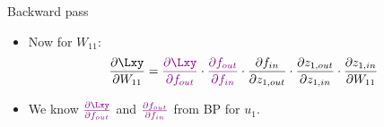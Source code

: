\begin{vbframe}{Backward pass}
  \begin{itemize}
    \item Now for $W_{11}$: $$\frac{\partial \Lxy}{\partial W_{11}} = \textcolor{violet}{\frac{\partial \Lxy}{\partial f_{out}}} \cdot \textcolor{violet}{\frac{\partial f_{out}}{\partial f_{in}}} \cdot \frac{\partial f_{in}}{\partial z_{1,out}} \cdot \frac{\partial z_{1,out}}{\partial z_{1,in}} \cdot \frac{\partial z_{1,in}}{\partial W_{11}}$$
  \end{itemize}

  \begin{itemize}
    \item We know $\textcolor{violet}{\frac{\partial \Lxy}{\partial f_{out}}}$ and $\textcolor{violet}{\frac{\partial f_{out}}{\partial f_{in}}}$ from BP for $u_1$.
  \begin{figure}
    \centering
  \end{figure}
\framebreak


\end{itemize}
\end{vbframe}
